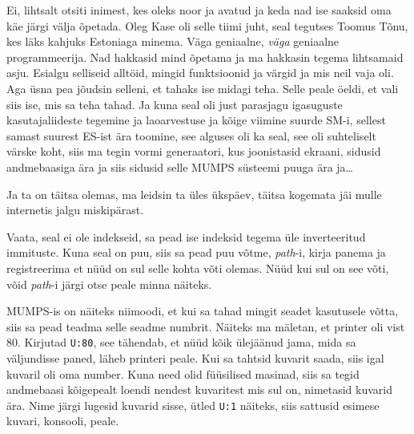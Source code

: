 Ei, lihtsalt otsiti inimest, kes oleks noor ja avatud ja keda nad ise saaksid oma käe järgi välja õpetada. Oleg Kase oli selle tiimi juht, seal tegutses Toomus Tõnu, kes läks kahjuks Estoniaga minema. Väga geniaalne, \emph{väga} geniaalne programmeerija. Nad hakkasid mind õpetama ja ma hakkasin tegema lihtsamaid asju. Esialgu selliseid alltöid, mingid funktsioonid ja värgid ja mis neil vaja oli. Aga üsna pea jõudsin selleni, et tahaks ise midagi teha. Selle peale öeldi, et vali siis ise, mis  sa teha tahad. Ja kuna seal oli just parasjagu igasuguste kasutajaliideste tegemine ja laoarvestuse ja kõige viimine suurde SM-i, sellest samast suurest ES-ist ära toomine, see alguses oli ka seal, see oli suhteliselt värske koht, siis ma tegin vormi generaatori, kus joonistasid ekraani, sidusid andmebaasiga ära ja siis sidusid selle MUMPS süsteemi puuga ära ja\ldots


Ja ta on täitsa olemas, ma leidsin ta üles ükspäev, täitsa kogemata jäi mulle internetis jalgu miskipärast. 

Vaata, seal ei ole indekseid, sa pead ise indeksid tegema üle inverteeritud immituste. Kuna seal on puu, siis sa pead puu võtme, \emph{path}-i, kirja panema ja registreerima et nüüd on sul selle kohta võti olemas. Nüüd kui sul on see võti, võid \emph{path}-i järgi otse peale minna näiteks. 

MUMPS-is on näiteks niimoodi, et kui sa tahad mingit seadet kasutusele võtta, siis sa pead teadma selle seadme numbrit. Näiteks ma mäletan, et printer oli vist 80. Kirjutad \verb|U:80|, see tähendab, et nüüd kõik ülejäänud jama, mida sa väljundisse paned, läheb printeri peale. Kui sa tahtsid kuvarit saada, siis igal kuvaril oli oma number. Kuna need olid füüsilised masinad, siis sa tegid andmebaasi kõigepealt loendi nendest kuvaritest mis sul on, nimetasid kuvarid ära. Nime järgi lugesid kuvarid sisse, ütled \verb|U:1| näiteks, siis sattusid esimese kuvari, konsooli, peale. 

